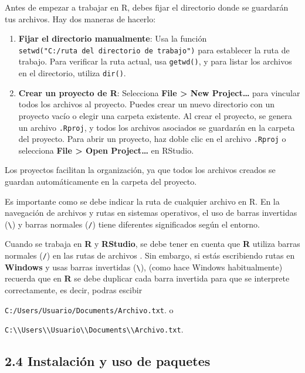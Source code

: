 \documentclass[
  letterpaper,
]{scrbook}
\begin{document}
Antes de empezar a trabajar en R, debes fijar el directorio donde se
guardarán tus archivos. Hay dos maneras de hacerlo:

\begin{enumerate}
\def\labelenumi{\arabic{enumi}.}
\item
  \textbf{Fijar el directorio manualmente}: Usa la función
  \texttt{setwd("C:/ruta\ del\ directorio\ de\ trabajo")} para
  establecer la ruta de trabajo. Para verificar la ruta actual, usa
  \texttt{getwd()}, y para listar los archivos en el directorio, utiliza
  \texttt{dir()}.
\item
  \textbf{Crear un proyecto de R}: Selecciona \textbf{File
  \textgreater{} New Project\ldots{}} para vincular todos los archivos
  al proyecto. Puedes crear un nuevo directorio con un proyecto vacío o
  elegir una carpeta existente. Al crear el proyecto, se genera un
  archivo \texttt{.Rproj}, y todos los archivos asociados se guardarán
  en la carpeta del proyecto. Para abrir un proyecto, haz doble clic en
  el archivo \texttt{.Rproj} o selecciona \textbf{File \textgreater{}
  Open Project\ldots{}} en RStudio.
\end{enumerate}

Los proyectos facilitan la organización, ya que todos los archivos
creados se guardan automáticamente en la carpeta del proyecto.

Es importante como se debe indicar la ruta de cualquier archivo en R. En
la navegación de archivos y rutas en sistemas operativos, el uso de
barras invertidas (\texttt{\textbackslash{}}) y barras normales
(\texttt{/}) tiene diferentes significados según el entorno.

Cuando se trabaja en \textbf{R} y \textbf{RStudio}, se debe tener en
cuenta que \textbf{R} utiliza barras normales (\texttt{/}) en las rutas
de archivos . Sin embargo, si estás escribiendo rutas en
\textbf{Windows} y usas barras invertidas (\texttt{\textbackslash{}}),
(como hace Windows habitualmente) recuerda que en \textbf{R} se debe
duplicar cada barra invertida para que se interprete correctamente, es
decir, podras escibir

\texttt{C:/Users/Usuario/Documents/Archivo.txt}. o

\texttt{C:\textbackslash{}\textbackslash{}Users\textbackslash{}\textbackslash{}Usuario\textbackslash{}\textbackslash{}Documents\textbackslash{}\textbackslash{}Archivo.txt}.

\hypertarget{instalaciuxf3n-y-uso-de-paquetes}{%
\subsection{2.4 Instalación y uso de
paquetes}\label{instalaciuxf3n-y-uso-de-paquetes}}
\end{document}
